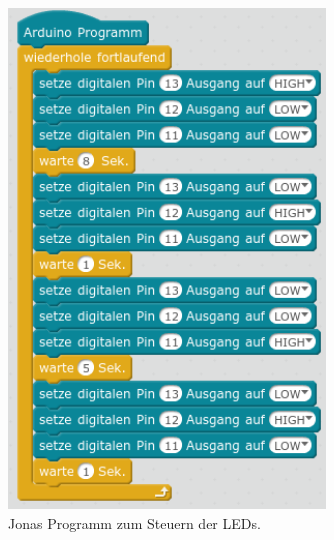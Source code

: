 \documentclass[ngerman, 11pt]{scrreprt}
\begin{document}
	\begin{figure}[H]
		\begin{minipage}{0.48\textwidth}
			\centering
			\includegraphics[width=0.75\textwidth]{../pics/ampel-ohne-variablen.png}
			\caption{Jonas Programm zum Steuern der LEDs.}
		\end{minipage}
		\hfill
		\begin{minipage}{0.48\textwidth}
			\centering

\end{minipage}
\end{figure}
\end{document}
